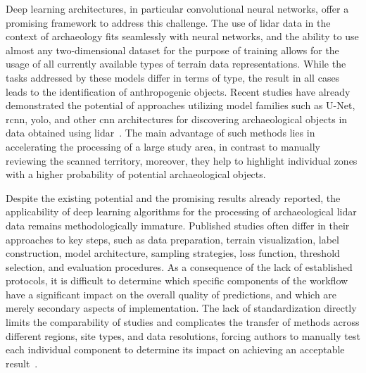 Deep learning architectures, in particular convolutional neural networks, offer a promising framework to address this challenge. The use of \gls{lidar} data in the context of archaeology fits seamlessly with neural networks, and the ability to use almost any two-dimensional dataset for the purpose of training allows for the usage of all currently available types of terrain data representations. While the tasks addressed by these models differ in terms of type, the result in all cases leads to the identification of anthropogenic objects. Recent studies have already demonstrated the potential of approaches utilizing model families such as U-Net, \gls{rcnn}, \gls{yolo}, and other \gls{cnn} architectures for discovering archaeological objects in data obtained using \gls{lidar}~\cite{bundzel_semantic_2020,somrak_learning_2020,guyot_objective_2021,zhang_unveiling_2024}. The main advantage of such methods lies in accelerating the processing of a large study area, in contrast to manually reviewing the scanned territory, moreover, they help to highlight individual zones with a higher probability of potential archaeological objects.

Despite the existing potential and the promising results already reported, the applicability of deep learning algorithms for the processing of archaeological \gls{lidar} data remains methodologically immature. Published studies often differ in their approaches to key steps, such as data preparation, terrain visualization, label construction, model architecture, sampling strategies, loss function, threshold selection, and evaluation procedures. As a consequence of the lack of established protocols, it is difficult to determine which specific components of the workflow have a significant impact on the overall quality of predictions, and which are merely secondary aspects of implementation. The lack of standardization directly limits the comparability of studies and complicates the transfer of methods across different regions, site types, and data resolutions, forcing authors to manually test each individual component to determine its impact on achieving an acceptable result~\cite{fiorucci_deep_2022,kokalj_standardizing_2025}.

